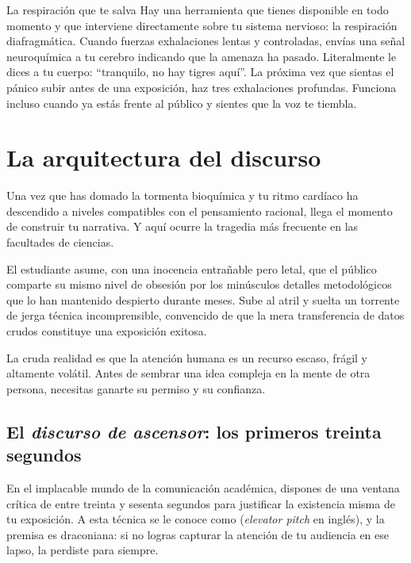 \begin{digress}{La respiración que te salva}
	Hay una herramienta que tienes disponible en todo momento y que interviene directamente sobre tu sistema nervioso: la respiración diafragmática.
	Cuando fuerzas exhalaciones lentas y controladas, envías una señal neuroquímica a tu cerebro indicando que la amenaza ha pasado.
	Literalmente le dices a tu cuerpo: “tranquilo, no hay tigres aquí”.
	La próxima vez que sientas el pánico subir antes de una exposición, haz tres exhalaciones profundas.
	Funciona incluso cuando ya estás frente al público y sientes que la voz te tiembla.
\end{digress}

\section{La arquitectura del discurso}
\label{sec:arquitecturadiscurso}

Una vez que has domado la tormenta bioquímica y tu ritmo cardíaco ha descendido a niveles compatibles con el pensamiento racional, llega el momento de construir tu narrativa.
Y aquí ocurre la tragedia más frecuente en las facultades de ciencias.

El estudiante asume, con una inocencia entrañable pero letal, que el público comparte su mismo nivel de obsesión por los minúsculos detalles metodológicos que lo han mantenido despierto durante meses.
Sube al atril y suelta un torrente de jerga técnica incomprensible, convencido de que la mera transferencia de datos crudos constituye una exposición exitosa.

La cruda realidad es que la atención humana es un recurso escaso, frágil y altamente volátil.
Antes de sembrar una idea compleja en la mente de otra persona, necesitas ganarte su permiso y su confianza.

\subsection*{El \emph{discurso de ascensor}: los primeros treinta segundos}

En el implacable mundo de la comunicación académica, dispones de una ventana crítica de entre treinta y sesenta segundos para justificar la existencia misma de tu exposición.
A esta técnica se le conoce como  (\emph{elevator pitch} en inglés), y la premisa es draconiana: si no logras capturar la atención de tu audiencia en ese lapso, la perdiste para siempre.

